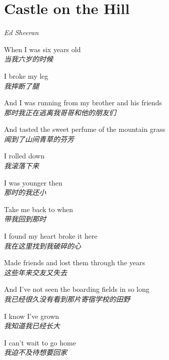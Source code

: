 \section{Castle on the Hill}

\thispagestyle{empty}


\begin{center}
\textit{Ed Sheeran}
\end{center}

\vspace{1em}

\begin{spacing}{1.5}
\begin{flushleft}
When I was six years old\\
\textit{当我六岁的时候}\lyricspace

I broke my leg\\
\textit{我摔断了腿}\lyricspace

And I was running from my brother and his friends\\
\textit{那时我正在逃离我哥哥和他的朋友们}\lyricspace

And tasted the sweet perfume of the mountain grass\\
\textit{闻到了山间青草的芬芳}\lyricspace

I rolled down\\
\textit{我滚落下来}\lyricspace

I was younger then\\
\textit{那时的我还小}\lyricspace

Take me back to when\\
\textit{带我回到那时}\lyricspace

I found my heart broke it here\\
\textit{我在这里找到我破碎的心}\lyricspace

Made friends and lost them through the years\\
\textit{这些年来交友又失去}\lyricspace

And I've not seen the boarding fields in so long\\
\textit{我已经很久没有看到那片寄宿学校的田野}\lyricspace

I know I've grown\\
\textit{我知道我已经长大}\lyricspace

I can't wait to go home\\
\textit{我迫不及待想要回家}\lyricspace


\end{flushleft}
\end{spacing}
